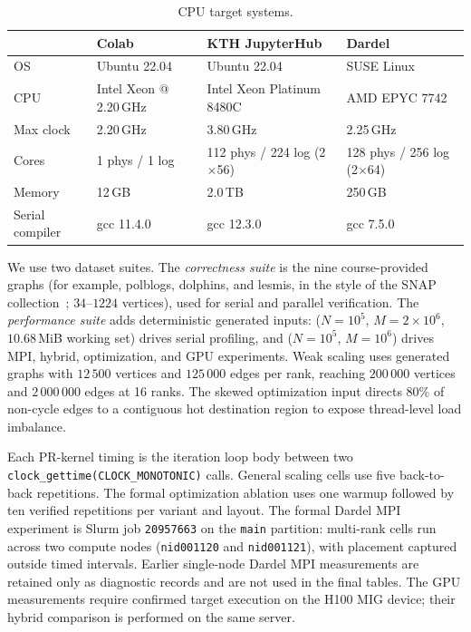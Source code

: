 \documentclass[11pt]{article}
\begin{document}
\begin{table}[H]
\centering
\caption{CPU target systems.}
\label{tab:systems}
\small
\begin{tabular}{@{}p{}p{}p{}p{}@{}}
\toprule
 & Colab & KTH JupyterHub & Dardel \\
\midrule
OS                & Ubuntu 22.04 & Ubuntu 22.04 & SUSE Linux \\
CPU               & Intel Xeon @ 2.20\,GHz & Intel Xeon Platinum 8480C & AMD EPYC 7742 \\
Max clock         & 2.20\,GHz & 3.80\,GHz & 2.25\,GHz \\
Cores             & 1 phys / 1 log & 112 phys / 224 log (2$\times$56) & 128 phys / 256 log (2$\times$64) \\
Memory            & 12\,GB & 2.0\,TB & 250\,GB \\
Serial compiler   & gcc 11.4.0 & gcc 12.3.0 & gcc 7.5.0 \\
\bottomrule
\end{tabular}
\end{table}

We use two dataset suites. The \emph{correctness suite} is the nine
course-provided graphs (for example, polblogs, dolphins, and lesmis, in
the style of the SNAP collection~\cite{snap}; $34$--$1224$ vertices),
used for serial and parallel verification. The \emph{performance suite}
adds deterministic generated inputs: 
($N=10^{5}$, $M=2{\times}10^{6}$, $10.68$\,MiB working set) drives
serial profiling, and 
($N=10^{5}$, $M=10^{6}$) drives MPI, hybrid, optimization, and GPU
experiments. Weak scaling uses generated graphs with $12\,500$ vertices
and $125\,000$ edges per rank, reaching $200\,000$ vertices and
$2\,000\,000$ edges at 16 ranks. The skewed optimization input directs
$80\%$ of non-cycle edges to a contiguous hot destination region to
expose thread-level load imbalance.

Each PR-kernel timing is the iteration loop body between two
\texttt{clock\_gettime(CLOCK\_MONOTONIC)} calls. General scaling cells
use five back-to-back repetitions. The formal optimization ablation uses
one warmup followed by ten verified repetitions per variant and layout.
The formal Dardel MPI experiment is Slurm job \texttt{20957663} on the
\texttt{main} partition: multi-rank cells run across two compute nodes
(\texttt{nid001120} and \texttt{nid001121}), with placement captured
outside timed intervals. Earlier single-node Dardel MPI measurements are
retained only as diagnostic records and are not used in the final tables.
The GPU measurements require confirmed target execution on the H100 MIG
device; their hybrid comparison is performed on the same server.
\end{document}
